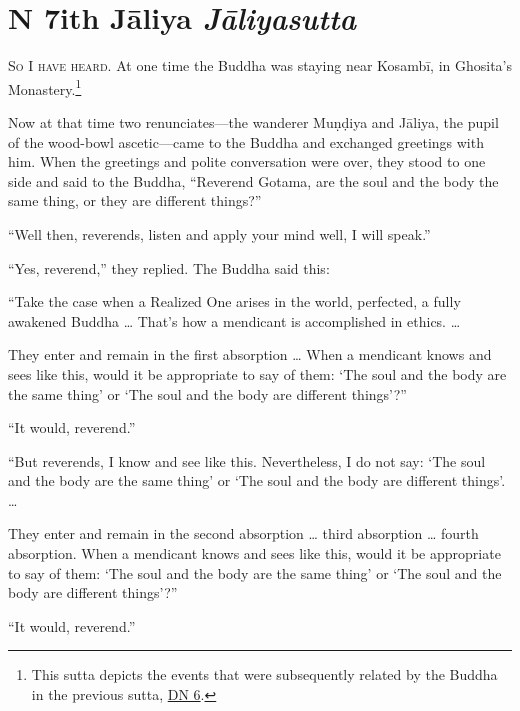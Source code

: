 \documentclass[12pt,openany]{book}%
\newcommand*{\suttatitleacronym}[1]{\smaller[2]{#1}\vspace*{.3em}}
\newcommand*{\suttatitletranslation}[1]{\linebreak{#1}}
\newcommand*{\suttatitleroot}[1]{\linebreak\smaller[2]\itshape{#1}}
\newcommand*{\tocacronym}[1]{\hspace*{-3.3em}{#1}\quad}
\newcommand*{\toctranslation}[1]{#1}
\newcommand*{\tocroot}[1]{(\textit{#1})}
\newcommand*{\scevam}[1]{\textsc{#1}}
\renewcommand*{\tocacronym}[1]{\hspace*{0em}{#1}\quad}%
\begin{document}
%
\chapter*{{\suttatitleacronym DN 7}{\suttatitletranslation With Jāliya }{\suttatitleroot Jāliyasutta}}
\addcontentsline{toc}{chapter}{\tocacronym{DN 7} \toctranslation{With Jāliya } \tocroot{Jāliyasutta}}

\scevam{So I have heard. }At one time the Buddha was staying near \textsanskrit{Kosambī}, in Ghosita’s Monastery.\footnote{This sutta depicts the events that were subsequently related by the Buddha in the previous sutta, \href{https://suttacentral.net/dn6/en/sujato}{DN 6}. } 

Now at that time two renunciates—the wanderer \textsanskrit{Muṇḍiya} and \textsanskrit{Jāliya}, the pupil of the wood-bowl ascetic—came to the Buddha and exchanged greetings with him. When the greetings and polite conversation were over, they stood to one side and said to the Buddha, “Reverend Gotama, are the soul and the body the same thing, or they are different things?” 

“Well then, reverends, listen and apply your mind well, I will speak.” 

“Yes, reverend,” they replied. The Buddha said this: 

“Take the case when a Realized One arises in the world, perfected, a fully awakened Buddha … That’s how a mendicant is accomplished in ethics. … 

They enter and remain in the first absorption … When a mendicant knows and sees like this, would it be appropriate to say of them: ‘The soul and the body are the same thing’ or ‘The soul and the body are different things’?” 

“It would, reverend.” 

“But reverends, I know and see like this. Nevertheless, I do not say: ‘The soul and the body are the same thing’ or ‘The soul and the body are different things’. … 

They enter and remain in the second absorption … third absorption … fourth absorption. When a mendicant knows and sees like this, would it be appropriate to say of them: ‘The soul and the body are the same thing’ or ‘The soul and the body are different things’?” 

“It would, reverend.” 
\end{document}
